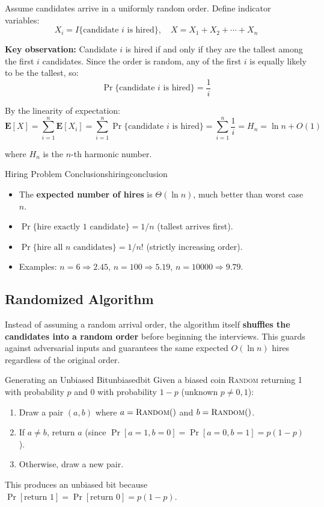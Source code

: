 Assume candidates arrive in a uniformly random order. Define indicator variables:
\[
  X_i = I\{\text{candidate } i \text{ is hired}\}, \quad X = X_1 + X_2 + \cdots + X_n
\]

\textbf{Key observation:} Candidate $i$ is hired if and only if they are the tallest among
the first $i$ candidates. Since the order is random, any of the first $i$ is equally likely
to be the tallest, so:
\[
  \Pr\{\text{candidate } i \text{ is hired}\} = \frac{1}{i}
\]

By the linearity of expectation:
\[
  \mathbf{E}[X] = \sum_{i=1}^{n} \mathbf{E}[X_i] = \sum_{i=1}^{n} \Pr\{\text{candidate } i \text{ is hired}\}
  = \sum_{i=1}^{n} \frac{1}{i} = H_n = \ln n + O(1)
\]

where $H_n$ is the $n$-th harmonic number.

\begin{remark}{Hiring Problem Conclusions}{hiringconclusion}
\begin{itemize}[noitemsep]
  \item The \textbf{expected number of hires} is $\Theta(\ln n)$, much better than worst case $n$.
  \item $\Pr\{\text{hire exactly 1 candidate}\} = 1/n$ (tallest arrives first).
  \item $\Pr\{\text{hire all } n \text{ candidates}\} = 1/n!$ (strictly increasing order).
  \item Examples: $n=6 \Rightarrow 2.45$, $n=100 \Rightarrow 5.19$, $n=10000 \Rightarrow 9.79$.
\end{itemize}
\end{remark}

\subsection{Randomized Algorithm}

Instead of assuming a random arrival order, the algorithm itself \textbf{shuffles the
candidates into a random order} before beginning the interviews. This guards against
adversarial inputs and guarantees the same expected $O(\ln n)$ hires regardless of the
original order.

\begin{remark}{Generating an Unbiased Bit}{unbiasedbit}
Given a biased coin \textsc{Random} returning 1 with probability $p$ and 0 with probability
$1-p$ (unknown $p \neq 0, 1$):
\begin{enumerate}[noitemsep]
  \item Draw a pair $(a, b)$ where $a = \textsc{Random}()$ and $b = \textsc{Random}()$.
  \item If $a \neq b$, return $a$ (since $\Pr[a=1, b=0] = \Pr[a=0, b=1] = p(1-p)$).
  \item Otherwise, draw a new pair.
\end{enumerate}
This produces an unbiased bit because $\Pr[\text{return } 1] = \Pr[\text{return } 0] = p(1-p)$.
\end{remark}

